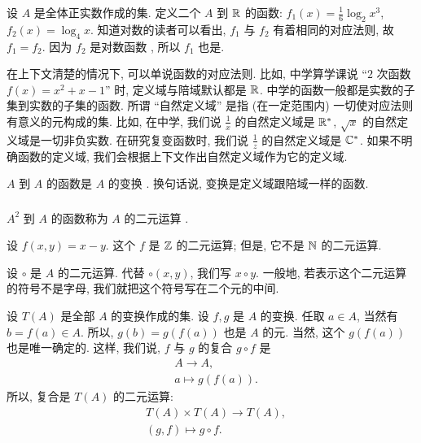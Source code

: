 \begin{example}
    设 $A$ 是全体正实数作成的集. 定义二个 $A$ 到 $\mathbb{R}$ 的函数: $f_1 (x) = \frac16 \log_{2} {x^3}$, $f_2 (x) = \log_{4} {x}$. 知道对数的读者可以看出, $f_1$ 与 $f_2$ 有着相同的对应法则, 故 $f_1 = f_2$. 因为 $f_2$ 是对数函数 , 所以 $f_1$ 也是.
\end{example}

\begin{remark}
    在上下文清楚的情况下, 可以单说函数的对应法则. 比如, 中学算学课说 ``$2$ 次函数 $f(x) = x^2 + x - 1$'' 时, 定义域与陪域默认都是 $\mathbb{R}$. 中学的函数一般都是实数的子集到实数的子集的函数. 所谓 ``自然定义域'' 是指 (在一定范围内) 一切使对应法则有意义的元构成的集. 比如, 在中学, 我们说 $\frac{1}{x}$ 的自然定义域是 $\mathbb{R}^{\ast}$, $\sqrt{x}$ 的自然定义域是一切非负实数. 在研究复变函数时, 我们说 $\frac{1}{z}$ 的自然定义域是 $\mathbb{C}^{\ast}$. 如果不明确函数的定义域, 我们会根据上下文作出自然定义域作为它的定义域.
\end{remark}

\begin{definition}
    $A$ 到 $A$ 的函数是 $A$ 的变换 . 换句话说, 变换是定义域跟陪域一样的函数.
\end{definition}

\subsubsection*{\BinaryFunctions}

\begin{definition}
    $A^2$ 到 $A$ 的函数称为 $A$ 的二元运算 .
\end{definition}

\begin{example}
    设 $f(x,y) = x-y$. 这个 $f$ 是 $\mathbb{Z}$ 的二元运算; 但是, 它不是 $\mathbb{N}$ 的二元运算.
\end{example}

\begin{remark}
    设 $\circ$ 是 $A$ 的二元运算. 代替 $\circ (x,y)$, 我们写 $x \circ y$. 一般地, 若表示这个二元运算的符号不是字母, 我们就把这个符号写在二个元的中间.
\end{remark}

\begin{definition}
    设 $T(A)$ 是全部 $A$ 的变换作成的集. 设 $f,g$ 是 $A$ 的变换. 任取 $a \in A$, 当然有 $b = f(a) \in A$. 所以, $g(b) = g(f(a))$ 也是 $A$ 的元. 当然, 这个 $g(f(a))$ 也是唯一确定的. 这样, 我们说, $f$ 与 $g$ 的复合  $g \circ f$ 是
    \begin{align*}
         & A \to A, \tag*{$g \circ f \colon$} \\
         & a \mapsto g(f(a)).
    \end{align*}
    所以, 复合是 $T(A)$ 的二元运算:
    \begin{align*}
         & T(A) \times T(A) \to T(A), \tag*{$\circ \colon$} \\
         & (g,f) \mapsto g \circ f.
    \end{align*}
\end{definition}

